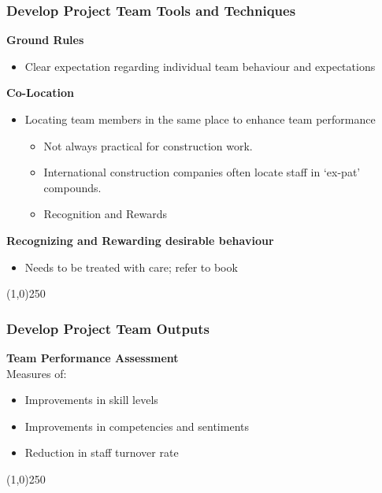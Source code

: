 \begin{frame}
\frametitle{Develop Project Team \hfill Tools and Techniques}
\textbf{Ground Rules}
	\begin{itemize}
		\item Clear expectation regarding individual team behaviour and expectations
	\end{itemize}
\textbf{Co-Location}
	\begin{itemize}
		\item Locating team members in the same place to enhance team performance
			\begin{itemize}
				\item Not always practical for construction work.
				\item International construction companies often locate staff in `ex-pat' compounds.  
				\item Recognition and Rewards
			\end{itemize}
	\end{itemize}
\textbf{Recognizing and Rewarding desirable behaviour}
		\begin{itemize}
			\item Needs to be treated with care; refer to book
		\end{itemize}
\end{frame}\begin{center}\line(1,0){250}\end{center}
 


 
\begin{frame}
\frametitle{Develop Project Team \hfill Outputs}
\textbf{Team Performance Assessment}\\
Measures of:	
\begin{itemize}
	\item Improvements in skill levels
	\item Improvements in competencies and sentiments
	\item Reduction in staff turnover rate
\end{itemize}
\end{frame}\begin{center}\line(1,0){250}\end{center}



